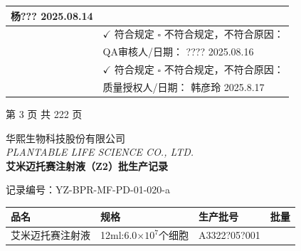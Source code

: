 \documentclass[UTF8,10pt,a4paper,fontset=fandol]{ctexart}
\newcommand{\fieldvalue}[1]{#1}
\newcommand{\handwritten}[1]{#1}
\let\mathcheckmark\checkmark
\renewcommand{\checkmark}{\ensuremath{\mathcheckmark}}
\begin{document}
\begin{tabularx}{\textwidth}{|p{2.4cm}|X|}
\handwritten{杨???}
\hspace{2em}
\handwritten{2025.08.14}\\
\hline
{} &
\fieldvalue{\handwritten{\checkmark}} 符合规定 \hspace{1em} $\square$ 不符合规定，不符合原因：\underline{\hspace{5cm}}\\
&
QA审核人/日期：
\handwritten{????}
\hspace{2em}
\handwritten{2025.08.16}\\
&
\fieldvalue{\handwritten{\checkmark}} 符合规定 \hspace{1em} $\square$ 不符合规定，不符合原因：\underline{\hspace{5cm}}\\
&
质量授权人/日期：
\handwritten{韩彦玲}
\hspace{2em}
\handwritten{2025.8.17}\\
\hline
\end{tabularx}

\vfill

\begin{center}
第 3 页 共 222 页
\end{center}

\newpage

\begin{center}
华熙生物科技股份有限公司\\
\textit{PLANTABLE LIFE SCIENCE CO., LTD.}\\[2mm]
\textbf{艾米迈托赛注射液（Z2）批生产记录}
\end{center}

记录编号：YZ-BPR-MF-PD-01-020-a

\begin{center}
\begin{tabularx}{0.9\textwidth}{|>{\centering\arraybackslash}X|>{\centering\arraybackslash}X|>{\centering\arraybackslash}X|>{\centering\arraybackslash}X|}
\hline
品名 & 规格 & 生产批号 & 批量\\
\hline
\fieldvalue{艾米迈托赛注射液} &
\fieldvalue{12ml:6.0$\times10^{7}$个细胞} &
\fieldvalue{\handwritten{A3322?05?001}} &
\fieldvalue{}\\
\hline
\end{tabularx}
\end{center}
\end{document}
